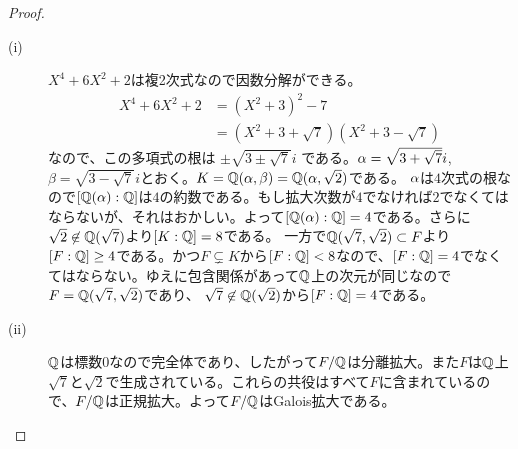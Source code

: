 \begin{proof} ${}$
  \begin{description}
\item[(i)] $X^4 + 6X^2 + 2$は複2次式なので因数分解ができる。
 \begin{align*}
  X^4 + 6X^2 + 2 &= (X^2 + 3)^2 - 7 \\
  &= (X^2 + 3 + \sqrt{7} )(X^2 + 3 - \sqrt{7} )
  \end{align*}
  なので、この多項式の根は
  $
  \pm \sqrt{ 3 \pm \sqrt{7}  } i
  $
  である。${\alpha} = \sqrt{ 3 + \sqrt{7}  } i $, $\beta =  \sqrt{ 3 - \sqrt{7}  } i$とおく。$K = {\mathbb Q}({\alpha}, \beta) = {\mathbb Q}({\alpha}, \sqrt{2})$である。
  ${\alpha}$は$4$次式の根なので$[{\mathbb Q}({\alpha} ) : {\mathbb Q}]$は$4$の約数である。もし拡大次数が$4$でなければ$2$でなくてはならないが、それはおかしい。よって$[{\mathbb Q}({\alpha} ) : {\mathbb Q}] = 4$である。さらに$\sqrt{2} \not\in {\mathbb Q}(\sqrt{7})$より$[K:{\mathbb Q}] = 8$である。
  一方で${\mathbb Q}(\sqrt{7}, \sqrt{2}) \subset F$より$[F : {\mathbb Q}] \geq 4$である。かつ$F \subsetneq K$から$[F : {\mathbb Q}] < 8$なので、$[F : {\mathbb Q}] = 4$でなくてはならない。ゆえに包含関係があって${\mathbb Q}$上の次元が同じなので$F = {\mathbb Q}(\sqrt{7}, \sqrt{2})$であり、
  $\sqrt{7} \not\in {\mathbb Q}(\sqrt{2})$から$[F:{\mathbb Q}] = 4$である。
  \item[(ii)] ${\mathbb Q}$は標数$0$なので完全体であり、したがって$F/{\mathbb Q}$は分離拡大。また$F$は${\mathbb Q}$上$\sqrt{7}$と$\sqrt{2}$で生成されている。これらの共役はすべて$F$に含まれているので、$F/{\mathbb Q}$は正規拡大。よって$F/{\mathbb Q}$はGalois拡大である。
  \end{description}
\end{proof}



\newpage



